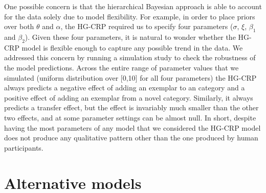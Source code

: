 \documentclass[doc]{apa6}
\begin{document}
One possible concern is that the hierarchical Bayesian approach is able to account for the data solely due to model flexibility. For example, in order to place priors over both $\theta$ and $\alpha$, the HG-CRP required us to specify four parameters ($\sigma$, $\xi$, $\beta_1$ and $\beta_2$). Given these four parameters, it is natural to wonder whether the HG-CRP model is flexible enough to capture any possible trend in the data. We addressed this concern by running a simulation study to check the robustness of the model predictions. Across the entire range of parameter values that we simulated (uniform distribution over [0,10] for all four parameters) the HG-CRP always predicts a negative effect of adding an exemplar to an category and a positive effect of adding an exemplar from a novel category. Similarly, it always predicts a transfer effect, but the effect is invariably much smaller than the other two effects, and at some parameter settings can be almost null. In short, despite having the most parameters of any model that we considered the HG-CRP model does not produce any qualitative pattern other than the one produced by human participants.




\section{Alternative models}
\end{document}

